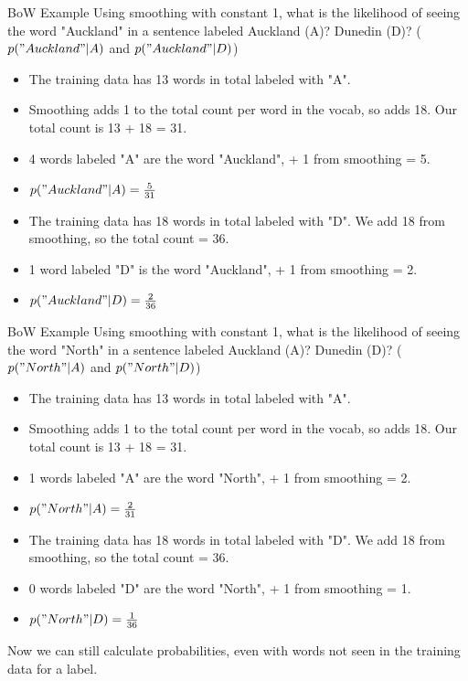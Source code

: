 \documentclass[aspectratio=169, 10pt]{beamer}
\begin{document}
\begin{frame}{BoW Example}
 Using smoothing with constant 1, what is the likelihood of seeing the word "Auckland" in a sentence labeled Auckland (A)? Dunedin (D)? ($p("Auckland"|A)$ and $p("Auckland"|D)$)
 \pause
 \begin{itemize}
     \item The training data has 13 words in total labeled with "A".
     \item Smoothing adds 1 to the total count per word in the vocab, so adds 18. Our total count is 13 + 18 = 31.
     \item 4 words labeled "A" are the word "Auckland", + 1 from smoothing = 5.
     \item $p("Auckland"|A) = \frac{5}{31}$
     \pause
     \item The training data has 18 words in total labeled with "D". We add 18 from smoothing, so the total count = 36.
     \item 1 word labeled "D" is the word "Auckland", + 1 from smoothing = 2.
     \item $p("Auckland"|D) = \frac{2}{36}$
 \end{itemize}
\end{frame}

\begin{frame}{BoW Example}
 Using smoothing with constant 1, what is the likelihood of seeing the word "North" in a sentence labeled Auckland (A)? Dunedin (D)? ($p("North"|A)$ and $p("North"|D)$)
 \pause
 \begin{itemize}
     \item The training data has 13 words in total labeled with "A".
     \item Smoothing adds 1 to the total count per word in the vocab, so adds 18. Our total count is 13 + 18 = 31.
     \item 1 words labeled "A" are the word "North", + 1 from smoothing = 2.
     \item $p("North"|A) = \frac{2}{31}$
     \pause
     \item The training data has 18 words in total labeled with "D". We add 18 from smoothing, so the total count = 36.
     \item 0 words labeled "D" are the word "North", + 1 from smoothing = 1.
     \item $p("North"|D) = \frac{1}{36}$
 \end{itemize}
 Now we can still calculate probabilities, even with words not seen in the training data for a label.
\end{frame}
\end{document}
